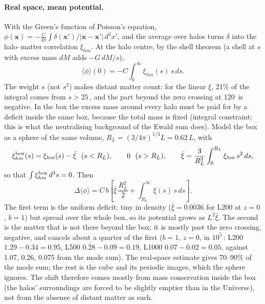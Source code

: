 \paragraph{Real space, mean potential.} With the Green's function of Poisson's equation,
$\phi(\mathbf x) = -\frac{C}{4\pi}\int\delta(\mathbf x')/|\mathbf x-\mathbf x'|\,d^3x'$, and the average over halos
turns $\delta$ into the halo--matter correlation $\xi_{hm}$. At the halo centre, by the shell theorem (a shell at $s$
with excess mass $dM$ adds $-G\,dM/s$),
\begin{equation}
\langle\phi\rangle(0) = -C\int_0^\infty\xi_{hm}(s)\,s\,ds .
\end{equation}
The weight $s$ (not $s^2$) makes distant matter count: for the linear $\xi$, 21\% of the integral comes from
$s > 25$\,\Mpch, and the part beyond the zero crossing at 120\,\Mpch{} is negative. In the box the excess mass
around every halo must be paid for by a deficit inside the same box, because the total mass is fixed (integral
constraint; this is what the neutralising background of the Ewald sum does). Model the box as a sphere of the same
volume, $R_L = (3/4\pi)^{1/3}L = 0.62\,L$, with
\begin{equation}
\xi^{\rm box}_{hm}(s) = \xi_{hm}(s) - \bar\xi\ \ (s<R_L),\qquad 0\ \ (s>R_L),\qquad
\bar\xi = \frac{3}{R_L^3}\int_0^{R_L}\xi_{hm}\,s^2\,ds,
\end{equation}
so that $\int\xi^{\rm box}_{hm}\,d^3s = 0$. Then
\begin{equation}
\Delta\langle\phi\rangle = C\,b\left[\bar\xi\,\frac{R_L^2}{2} + \int_{R_L}^\infty\xi(s)\,s\,ds\right].
\end{equation}
The first term is the uniform deficit: tiny in density ($\bar\xi = 0.0036$ for L200 at $z = 0$, $b = 1$) but spread
over the whole box, so its potential grows as $L^2\bar\xi$. The second is the matter that is not there beyond the box;
it is mostly past the zero crossing, negative, and cancels about a quarter of the first ($b = 1$, $z = 0$, in
$10^5$\,\kms: L200 $1.29-0.34 = 0.95$, L500 $0.28-0.09 = 0.19$, L1000 $0.07-0.02 = 0.05$, against 1.07, 0.26, 0.075
from the mode sum). The real-space estimate gives 70--90\% of the mode sum; the rest is the cube and its periodic
images, which the sphere ignores. The shift therefore comes mostly from mass conservation inside the box (the halos'
surroundings are forced to be slightly emptier than in the Universe), not from the absence of distant matter as such.

